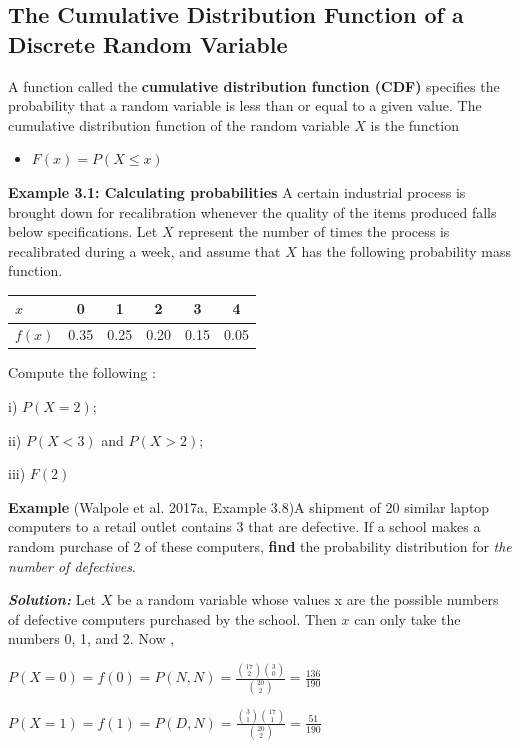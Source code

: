 \documentclass[
  11pt,
  letterpaper,
  DIV=11,
  numbers=noendperiod]{scrreprt}
\providecommand{\tightlist}{%
  \setlength{\itemsep}{0pt}\setlength{\parskip}{0pt}}
\begin{document}
\subsection{The Cumulative Distribution Function of a Discrete Random
Variable}\label{the-cumulative-distribution-function-of-a-discrete-random-variable}

A function called the \textbf{cumulative distribution function (CDF)}
specifies the probability that a random variable is less than or equal
to a given value. The cumulative distribution function of the random
variable \(X\) is the function

\begin{itemize}
\tightlist
\item
  \(F(x) = P(X \le x)\)
\end{itemize}

\textbf{Example 3.1: Calculating probabilities} A certain industrial
process is brought down for recalibration whenever the quality of the
items produced falls below specifications. Let \(X\) represent the
number of times the process is recalibrated during a week, and assume
that \(X\) has the following probability mass function.

\begin{longtable}[]{@{}lccccc@{}}
\toprule\noalign{}
\(x\) & 0 & 1 & 2 & 3 & 4 \\
\midrule\noalign{}
\endhead
\bottomrule\noalign{}
\endlastfoot
\(f(x)\) & 0.35 & 0.25 & 0.20 & 0.15 & 0.05 \\
\end{longtable}

Compute the following :

i) \(P(X=2)\);

ii) \(P(X<3)\) and \(P(X>2)\);

iii) \(F(2)\)

\textbf{Example} (Walpole et al. 2017a, Example 3.8)A shipment of 20
similar laptop computers to a retail outlet contains 3 that are
defective. If a school makes a random purchase of 2 of these computers,
\textbf{find} the probability distribution for \emph{the number of
defectives}.

\textbf{\emph{Solution:}} Let \(X\) be a random variable whose values x
are the possible numbers of defective computers purchased by the school.
Then \(x\) can only take the numbers 0, 1, and 2. Now ,

\(P(X=0)=f(0)=P(N,N)=\frac{\binom{17}{2}\binom{3}{0}}{\binom{20}{2}}=\frac{136}{190}\)

\(P(X=1)=f(1)=P(D,N)=\frac{\binom{3}{1}\binom{17}{1}}{\binom{20}{2}}=\frac{51}{190}\)
\end{document}
